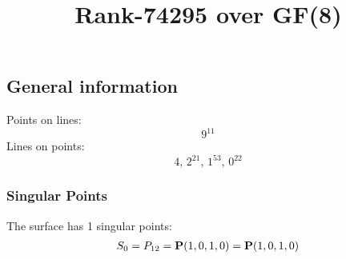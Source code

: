 \documentclass{article}
\newcommand\setTBstruts{\def\T{\rule{0pt}{2.6ex}}%
\def\B{\rule[-1.2ex]{0pt}{0pt}}}
\newcommand{\bP}{{\bf P}}
\begin{document}
 
\setTBstruts



{\allowdisplaybreaks%






\title{Rank-74295 over GF(8)}
\author{}%
\maketitle%
%
{}



\subsection*{General information}
Points on lines:
$$
9^{11}$$
Lines on points:
$$
4,\,2^{21},\,1^{53},\,0^{22}$$
\subsubsection*{Singular Points}
The surface has 1 singular points:\\
\begin{align*}
S_{0} &= P_{12}=\bP(1, 0, 1, 0) = \bP(1, 0, 1, 0)\\
\end{align*}
}
\end{document}
